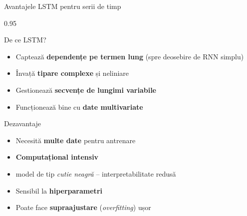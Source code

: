 \documentclass[9pt, aspectratio=169, t]{beamer}
\begin{document}
\begin{frame}{Avantajele LSTM pentru serii de timp}
    \begin{cminipage}{0.95\textwidth}
        \begin{exampleblock}{De ce LSTM?}
            \begin{itemize}\setlength{\itemsep}{0pt}
                \item Captează \textbf{dependențe pe termen lung} (spre deosebire de RNN simplu)
                \item Învață \textbf{tipare complexe} și neliniare
                \item Gestionează \textbf{secvențe de lungimi variabile}
                \item Funcționează bine cu \textbf{date multivariate}
            \end{itemize}
        \end{exampleblock}

        \vspace{0.2cm}

        \begin{alertblock}{Dezavantaje}
            \begin{itemize}\setlength{\itemsep}{0pt}
                \item Necesită \textbf{multe date} pentru antrenare
                \item \textbf{Computațional intensiv}
                \item model de tip \emph{cutie neagră} -- interpretabilitate redusă
                \item Sensibil la \textbf{hiperparametri}
                \item Poate face \textbf{supraajustare} (\emph{overfitting}) ușor
            \end{itemize}
        \end{alertblock}
    \end{cminipage}
\end{frame}
\end{document}
